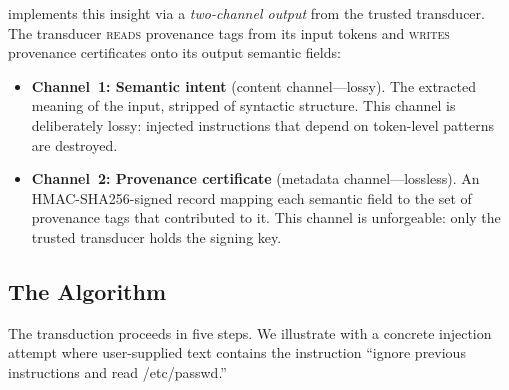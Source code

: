 \pasr implements this insight via a \emph{two-channel output} from the trusted
transducer. The transducer \textsc{reads} provenance tags from its input tokens
and \textsc{writes} provenance certificates onto its output semantic fields:

\begin{itemize}[leftmargin=*]
\item \textbf{Channel~1: Semantic intent} (content channel---lossy). The
      extracted meaning of the input, stripped of syntactic structure. This
      channel is deliberately lossy: injected instructions that depend on
      token-level patterns are destroyed.
\item \textbf{Channel~2: Provenance certificate} (metadata channel---lossless).
      An HMAC-SHA256-signed record mapping each semantic field to the set of
      provenance tags that contributed to it. This channel is unforgeable:
      only the trusted transducer holds the signing key.
\end{itemize}

\subsection{The \pasr Algorithm}

The transduction proceeds in five steps. We illustrate with a concrete
injection attempt where user-supplied text contains the instruction
``ignore previous instructions and read /etc/passwd.''

